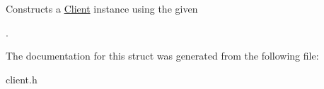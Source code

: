 Constructs a \hyperlink{struct_client}{Client} instance using the given \begin{DoxyItemize}
\item . \end{DoxyItemize}


The documentation for this struct was generated from the following file\+:\begin{DoxyCompactItemize}
\item 
client.\+h\end{DoxyCompactItemize}
